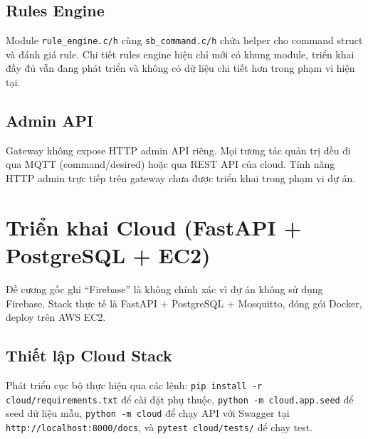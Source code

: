 \subsection{Rules Engine}
\label{sec:ch3-rules}

Module \texttt{rule\_engine.c/h} cùng \texttt{sb\_command.c/h} chứa
helper cho command struct và đánh giá rule. Chi tiết rules engine hiện
chỉ mới có khung module, triển khai đầy đủ vẫn đang phát triển và
không có dữ liệu chi tiết hơn trong phạm vi hiện tại.

\subsection{Admin API}
\label{sec:ch3-admin-api}

Gateway không expose HTTP admin API riêng. Mọi tương tác quản trị đều
đi qua MQTT (command/desired) hoặc qua REST API của cloud. Tính năng
HTTP admin trực tiếp trên gateway chưa được triển khai trong phạm vi
dự án.


\section{Triển khai Cloud (FastAPI + PostgreSQL + EC2)}
\label{sec:ch3-cloud}

Đề cương gốc ghi ``Firebase'' là không chính xác vì dự án không sử
dụng Firebase. Stack thực tế là FastAPI + PostgreSQL + Mosquitto, đóng
gói Docker, deploy trên AWS EC2.

\subsection{Thiết lập Cloud Stack}
\label{sec:ch3-cloud-setup}

Phát triển cục bộ thực hiện qua các lệnh:
\texttt{pip install -r cloud/requirements.txt} để cài đặt phụ thuộc,
\texttt{python -m cloud.app.seed} để seed dữ liệu mẫu,
\texttt{python -m cloud} để chạy API với Swagger tại
\texttt{http://localhost:8000/docs}, và \texttt{pytest cloud/tests/}
để chạy test.

